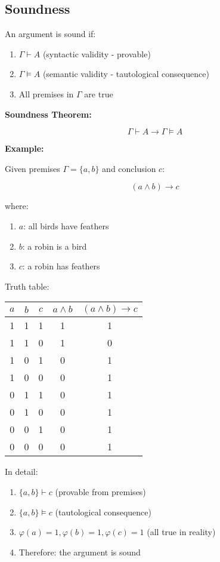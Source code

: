 \documentclass[12pt,a4paper,openany]{article}
\begin{document}
\subsection{Soundness}\label{soundness}

An argument is sound if: 

\begin{enumerate}
\item \(\Gamma \vdash A\) (syntactic validity - provable)
\item \(\Gamma \models A\) (semantic validity - tautological consequence)
\item All premises in \(\Gamma\) are true
\end{enumerate}

\textbf{Soundness Theorem:}

\[\Gamma \vdash A \to \Gamma \models A \]

\textbf{Example:} 

Given premises \(\Gamma = \{a, b\}\) and conclusion \(c\):

\[(a \land b) \to c\]

where:

\begin{enumerate}
\item \(a\): all birds have feathers
\item \(b\): a robin is a bird
\item \(c\): a robin has feathers
\end{enumerate}

Truth table:

\begin{center}
\begin{tabular}{|c|c|c|c|c|}
\hline
\(a\) & \(b\) & \(c\) & \(a \land b\) & \((a \land b) \to c\) \\
\hline
1 & 1 & 1 & 1 & 1 \\
1 & 1 & 0 & 1 & 0 \\
1 & 0 & 1 & 0 & 1 \\
1 & 0 & 0 & 0 & 1 \\
0 & 1 & 1 & 0 & 1 \\
0 & 1 & 0 & 0 & 1 \\
0 & 0 & 1 & 0 & 1 \\
0 & 0 & 0 & 0 & 1 \\
\hline
\end{tabular}
\end{center}

In detail: 

\begin{enumerate}
\item \(\{a, b\} \vdash c\) (provable from premises)
\item \(\{a, b\} \models c\) (tautological consequence)
\item \(\varphi(a) = 1, \varphi(b) = 1, \varphi(c) = 1\) (all true in reality)
\item Therefore: the argument is sound
\end{enumerate}
\end{document}
